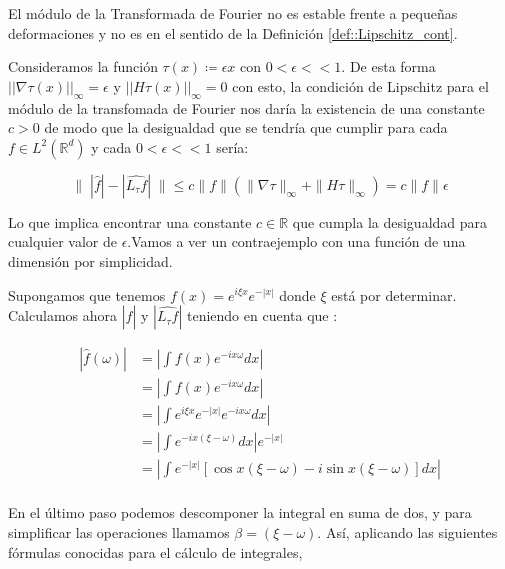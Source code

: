 \begin{observacion}\label{lemma:TF_inestable_difeomorfismos}
  El módulo de la Transformada de Fourier no es estable frente a pequeñas deformaciones y no es  en el sentido de la Definición \ref{def::Lipschitz_cont}.

  \medskip

  \noindent Consideramos la función $\tau(x)\coloneqq \epsilon x$ con $0 < \epsilon << 1$. De esta forma $||\nabla \tau (x) ||_\infty = \epsilon$ y $||H\tau(x)||_\infty=0$ con esto, la condición de Lipschitz para el módulo de la transfomada de Fourier nos daría la existencia de una constante $c>0$ de modo que la desigualdad que se tendría que cumplir para cada $f \in L^2(\mathbb{R}^d)$ y cada $0 < \epsilon << 1$ sería:


  \begin{equation} \label{eq::lipschitz_condition}
    \|\;|\widehat{f}| -|\widehat{L_\tau f}| \; \| \leq c \|f\| (\|\nabla \tau \|_{\infty} + \|H\tau\|_\infty) = c \|f\| \epsilon
  \end{equation}

  \noindent Lo que implica encontrar una constante $c\in \mathbb{R}$ que cumpla la desigualdad para cualquier valor de $\epsilon$.Vamos a ver un contraejemplo con una función de una dimensión por simplicidad.

  \medskip

  \noindent Supongamos que tenemos $f(x)=e^{i \xi x}e^{-|x|}$ donde $\xi$ está por determinar. Calculamos ahora $|\widehat{f}|$ y $|\widehat{L_\tau f}|$ teniendo en cuenta que :


  \begin{align*}
    |\widehat{f}(\omega)|&=\left|  \int{f(x)e^{-ix\omega}dx}  \right | \\
    &=\left|  \int{f(x)e^{-ix\omega}dx}  \right | \\
    &=\left|  \int{e^{i \xi x}e^{-|x|}e^{-ix\omega}dx}  \right | \\
    &=\left|  \int{e^{-ix(\xi-\omega)}dx} \right |e^{-|x|} \\
    &=\left|  \int{e^{-|x|}\left[\cos{x(\xi-\omega)} -i\sin{x(\xi-\omega)}\right]dx} \right| \\
  \end{align*}

  \noindent En el último paso podemos descomponer la integral en suma de dos, y para simplificar las operaciones llamamos $\beta=(\xi - \omega)$. Así, aplicando las siguientes fórmulas conocidas para el cálculo de integrales,



\end{observacion}
